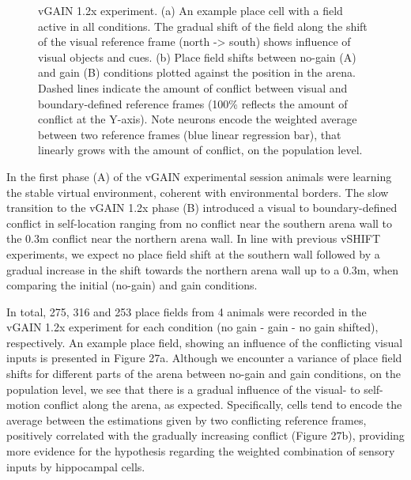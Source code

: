 \begin{figure}
\captionsetup{format=plain}
\caption[Sensory integration in gradual mismatch in vGAIN 1.2x]{
vGAIN 1.2x experiment. (a) An example place cell with a field active in all conditions. The gradual shift of the field along the shift of the visual reference frame (north -> south) shows influence of visual objects and cues. (b) Place field shifts between no-gain (A) and gain (B) conditions plotted against  the position in the arena. Dashed lines indicate the amount of conflict between visual and boundary-defined reference frames (100\% reflects the amount of conflict at the Y-axis). Note neurons encode the weighted average between two reference frames (blue linear regression bar), that linearly grows with the amount of conflict, on the population level.
}
\label{fig:F27_gain_12x}
\end{figure}

In the first phase (A) of the vGAIN experimental session animals were learning the stable virtual environment, coherent with environmental borders. The slow transition to the vGAIN 1.2x phase (B) introduced a visual to boundary-defined conflict in self-location ranging from no conflict near the southern arena wall to the 0.3m conflict near the northern arena wall. In line with previous vSHIFT experiments, we expect no place field shift at the southern wall followed by a gradual increase in the shift towards the northern arena wall up to a 0.3m, when comparing the initial (no-gain) and gain conditions.

In total, 275, 316 and 253 place fields from 4 animals were recorded in the vGAIN 1.2x experiment for each condition (no gain - gain - no gain shifted), respectively. An example place field, showing an influence of the conflicting visual inputs is presented in Figure 27a. Although we encounter a variance of place field shifts for different parts of the arena between no-gain and gain conditions, on the population level, we see that there is a gradual influence of the visual- to self-motion conflict along the arena, as expected. Specifically, cells tend to encode the average between the estimations given by two conflicting reference frames, positively correlated with the gradually increasing conflict (Figure 27b), providing more evidence for the hypothesis regarding the weighted combination of sensory inputs by hippocampal cells.


